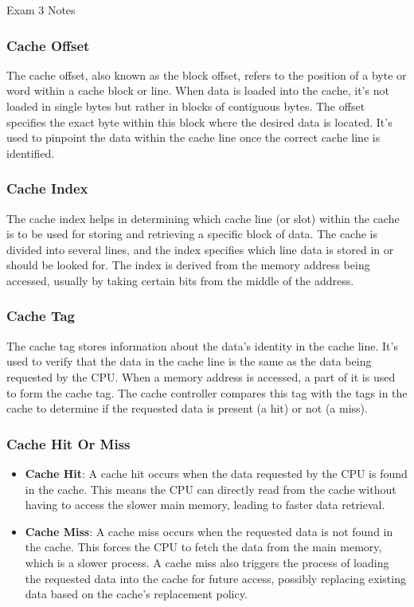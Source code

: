 \begin{examnotes}{Exam 3 Notes}
    \subsubsection*{Cache Offset}

    The cache offset, also known as the block offset, refers to the position of a byte or word within a cache block or line. When data is loaded into the cache, it's not loaded in single bytes but 
    rather in blocks of contiguous bytes. The offset specifies the exact byte within this block where the desired data is located. It's used to pinpoint the data within the cache line once the correct 
    cache line is identified.

    \subsubsection*{Cache Index}

    The cache index helps in determining which cache line (or slot) within the cache is to be used for storing and retrieving a specific block of data. The cache is divided into several lines, and 
    the index specifies which line data is stored in or should be looked for. The index is derived from the memory address being accessed, usually by taking certain bits from the middle of the address.

    \subsubsection*{Cache Tag}

    The cache tag stores information about the data's identity in the cache line. It's used to verify that the data in the cache line is the same as the data being requested by the CPU. When a memory 
    address is accessed, a part of it is used to form the cache tag. The cache controller compares this tag with the tags in the cache to determine if the requested data is present (a hit) or not (a miss).

    \subsubsection*{Cache Hit Or Miss}

    \begin{itemize}
        \item \textbf{Cache Hit}: A cache hit occurs when the data requested by the CPU is found in the cache. This means the CPU can directly read from the cache without having to access the slower 
        main memory, leading to faster data retrieval.
        \item \textbf{Cache Miss}: A cache miss occurs when the requested data is not found in the cache. This forces the CPU to fetch the data from the main memory, which is a slower process. A cache 
        miss also triggers the process of loading the requested data into the cache for future access, possibly replacing existing data based on the cache's replacement policy.
    \end{itemize}
\end{examnotes}


